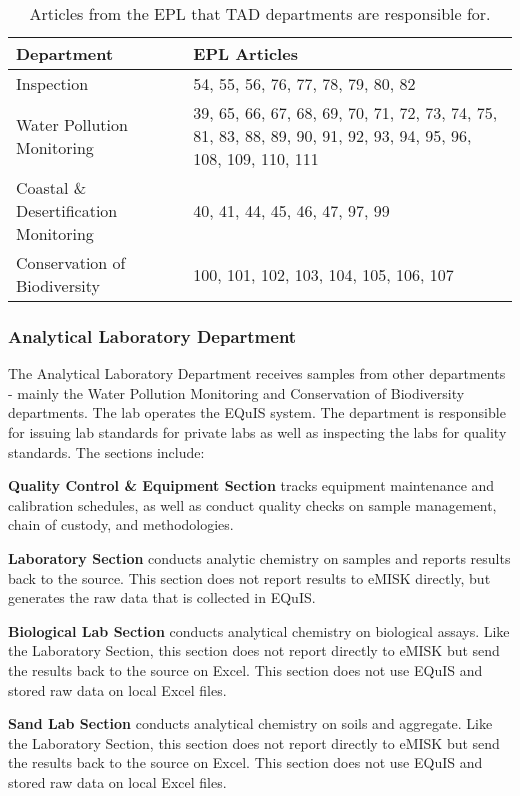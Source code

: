 \begin{table}[!htpb]
\centering
\caption{Articles from the EPL that TAD departments are responsible for.}
\label{tab:tadarts}
\begin{tabular}{@{}p{6cm}p{6cm}@{}}
\toprule
\textbf{Department} & \textbf{EPL Articles} \\ \midrule
Inspection & 54, 55, 56, 76, 77, 78, 79, 80, 82 \\
Water Pollution Monitoring & 39, 65, 66, 67, 68, 69, 70, 71, 72, 73, 74, 75, 81, 83, 88, 89, 90, 91, 92, 93, 94, 95, 96, 108, 109, 110, 111 \\
Coastal \& Desertification Monitoring & 40, 41, 44, 45, 46, 47, 97, 99 \\
Conservation of Biodiversity & 100, 101, 102, 103, 104, 105, 106, 107 \\ \bottomrule
\end{tabular}
\end{table}

\subsubsection{Analytical Laboratory Department}

The Analytical Laboratory Department receives samples from other departments - mainly the Water Pollution Monitoring and Conservation of Biodiversity departments. The lab operates the EQuIS system. The department is responsible for issuing lab standards for private labs as well as inspecting the labs for quality standards. The sections include:

\textbf{Quality Control \& Equipment Section} tracks equipment maintenance and calibration schedules, as well as conduct quality checks on sample management, chain of custody, and methodologies.

\textbf{Laboratory Section} conducts analytic chemistry on samples and reports results back to the source. This section does not report results to eMISK directly, but generates the raw data that is collected in EQuIS.

\textbf{Biological Lab Section} conducts analytical chemistry on biological assays. Like the Laboratory Section, this section does not report directly to eMISK but send the results back to the source on Excel. This section does not use EQuIS and stored raw data on local Excel files.

\textbf{ Sand Lab Section} conducts analytical chemistry on soils and aggregate. Like the Laboratory Section, this section does not report directly to eMISK but send the results back to the source on Excel. This section does not use EQuIS and stored raw data on local Excel files.

